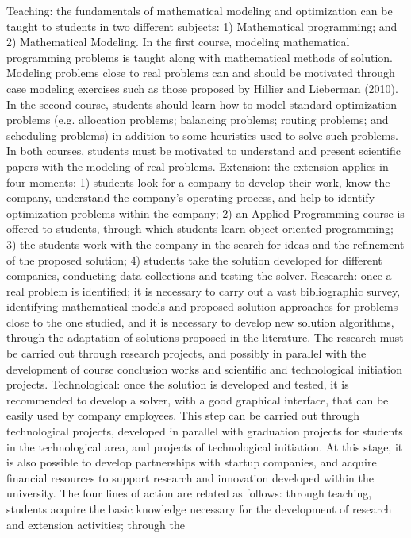 \documentclass[preprint,12pt,authoryear]{elsarticle}
\begin{document}
Teaching: the fundamentals of mathematical modeling and optimization can be taught to
students in two different subjects: 1) Mathematical programming; and 2) Mathematical
Modeling. In the first course, modeling mathematical programming problems is taught along
with mathematical methods of solution. Modeling problems close to real problems can and
should be motivated through case modeling exercises such as those proposed by Hillier and
Lieberman (2010). In the second course, students should learn how to model standard
optimization problems (e.g. allocation problems; balancing problems; routing problems; and
scheduling problems) in addition to some heuristics used to solve such problems. In both
courses, students must be motivated to understand and present scientific papers with the
modeling of real problems.
Extension: the extension applies in four moments: 1) students look for a company to develop
their work, know the company, understand the company's operating process, and help to
identify optimization problems within the company; 2) an Applied Programming course is
offered to students, through which students learn object-oriented programming; 3) the
students work with the company in the search for ideas and the refinement of the proposed
solution; 4) students take the solution developed for different companies, conducting data
collections and testing the solver.
Research: once a real problem is identified; it is necessary to carry out a vast bibliographic
survey, identifying mathematical models and proposed solution approaches for problems close
to the one studied, and it is necessary to develop new solution algorithms, through the
adaptation of solutions proposed in the literature. The research must be carried out through
research projects, and possibly in parallel with the development of course conclusion works
and scientific and technological initiation projects.
Technological: once the solution is developed and tested, it is recommended to develop a
solver, with a good graphical interface, that can be easily used by company employees. This
step can be carried out through technological projects, developed in parallel with graduation
projects for students in the technological area, and projects of technological initiation. At this
stage, it is also possible to develop partnerships with startup companies, and acquire financial
resources to support research and innovation developed within the university.
The four lines of action are related as follows: through teaching, students acquire the basic
knowledge necessary for the development of research and extension activities; through the
\end{document}
